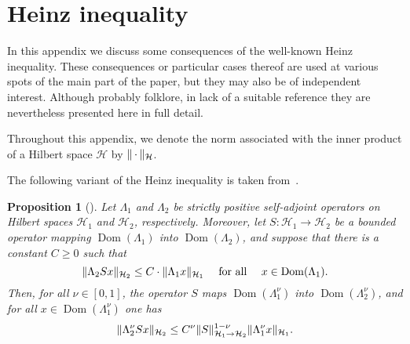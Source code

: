 \documentclass[11pt,a4paper]{amsart}
\numberwithin{equation}{section}
\DeclareMathOperator{\Dom}{Dom}
\DeclarePairedDelimiter{\norm}{\lVert}{\rVert}
\newcommand{\cH}{{\mathcal H}}
\theoremstyle{plain}
\newtheorem{proposition}[theorem]{Proposition}
\theoremstyle{definition}
\theoremstyle{remark}
\begin{document}
\appendix

\section{Heinz inequality}\label{sec:heinz}

In this appendix we discuss some consequences of the well-known Heinz inequality. These consequences or particular cases thereof
are used at various spots of the main part of the paper, but they may also be of independent interest. Although probably
folklore, in lack of a suitable reference they are nevertheless presented here in full detail.

Throughout this appendix, we denote the norm associated with the inner product of a Hilbert space $\cH$ by
$\norm{\,\cdot\,}_\cH$.

The following variant of the Heinz inequality is taken from~\cite{Kre71}.

\begin{proposition}[{\cite[Theorem~I.7.1]{Kre71}}]\label{propHeinz}
  Let $\Lambda_1$ and $\Lambda_2$ be strictly positive self-adjoint operators on Hilbert spaces $\cH_1$ and $\cH_2$,
  respectively. Moreover, let $S\colon\cH_1\to\cH_2$ be a bounded operator mapping $\Dom(\Lambda_1)$ into $\Dom(\Lambda_2)$, and
  suppose that there is a constant $C\ge0$ such that
  \begin{equation*}
    \norm{\Lambda_2Sx}_{\cH_2}
    \le
    C\cdot\norm{\Lambda_1x}_{\cH_1}
    \quad\text{ for all }\quad
    x\in\Dom(\Lambda_1)
    .
  \end{equation*}
  Then, for all $\nu\in[0,1]$, the operator $S$ maps $\Dom(\Lambda_1^\nu)$ into $\Dom(\Lambda_2^\nu)$, and for all
  $x\in\Dom(\Lambda_1^\nu)$ one has
  \begin{equation*}
    \norm{\Lambda_2^\nu Sx}_{\cH_2}
    \le
    C^\nu\norm{S}_{\cH_1\to\cH_2}^{1-\nu}\norm{\Lambda_1^\nu x}_{\cH_1}
    .
  \end{equation*}
\end{proposition}
\end{document}
